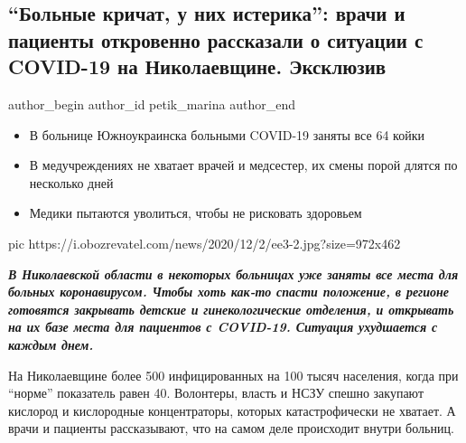  
 
 
 
 
 
\subsection{\enquote{Больные кричат, у них истерика}: врачи и пациенты откровенно рассказали о ситуации с COVID-19 на Николаевщине. Эксклюзив}
\label{sec:03_12_2020.news.ua.obozrevatel.petik_marina.1.kovid_nikolaev}
\ifcmt
	author_begin
   author_id petik_marina
	author_end
\fi

\begin{itemize}
  \item В больнице Южноукраинска больными COVID-19 заняты все 64 койки
  \item В медучреждениях не хватает врачей и медсестер, их смены порой длятся по несколько дней
  \item Медики пытаются уволиться, чтобы не рисковать здоровьем
\end{itemize}

\ifcmt
pic https://i.obozrevatel.com/news/2020/12/2/ee3-2.jpg?size=972x462
\fi

\begin{leftbar}
	\bfseries\em
В Николаевской области в некоторых больницах уже заняты все места для больных
коронавирусом. Чтобы хоть как-то спасти положение, в регионе готовятся
закрывать детские и гинекологические отделения, и открывать на их базе места
для пациентов с COVID-19. Ситуация ухудшается с каждым днем.

На Николаевщине более 500 инфицированных на 100 тысяч населения, когда при
\enquote{норме} показатель равен 40. Волонтеры, власть и НСЗУ спешно закупают кислород
и кислородные концентраторы, которых катастрофически не хватает. А врачи и
пациенты рассказывают, что на самом деле происходит внутри больниц.
\end{leftbar}

